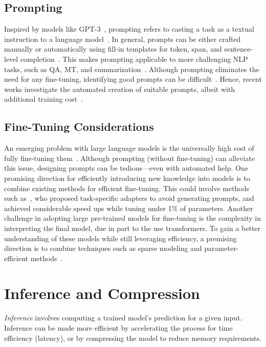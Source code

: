 \subsection{Prompting}\label{sec:prompting}
Inspired by models like GPT-3~\citep{brown2020language}, prompting refers to casting a task as a textual instruction to a language model~\citep{liu2021pre}. In general, prompts can be either crafted manually or automatically using fill-in templates for token, span, and sentence-level completion~\citep{petroni-etal-2019-language,brown2020language,shin-etal-2020-autoprompt}. This makes prompting applicable to more challenging NLP tasks, such as QA, MT, and summarization~\citep{schick-schutze-2021-just}. Although prompting eliminates the need for any fine-tuning, identifying good prompts can be difficult~\cite{liu2021gpt}. Hence, recent works investigate the automated creation of suitable prompts, albeit with additional training cost~\citep{Bach2022-di}.

\subsection{Fine-Tuning Considerations} An emerging problem with large language models is the universally high cost of fully fine-tuning them~\citep{chen2021evaluating}. Although prompting (without fine-tuning) can alleviate this issue, designing prompts can be tedious---even with automated help. One promising direction for efficiently introducing new knowledge into models is to combine existing methods for efficient fine-tuning. This could involve methods such as~\citet{karimi-mahabadi-etal-2022-prompt}, who proposed task-specific adapters to avoid generating prompts, and achieved considerable speed ups while tuning under 1\% of parameters. Another challenge in adopting large pre-trained models for fine-tuning is the complexity in interpreting the final model, due in part to the use transformers. To gain a better understanding of these models while still leveraging efficiency, a premising direction is to combine techniques such as sparse modeling and parameter-efficient methods~\citep{correia_adaptively_2019,treviso-etal-2022-predicting}.

\section{Inference and Compression} \label{sec:inference}

\textit{Inference} involves computing a trained model's prediction for a given input. Inference can be made more efficient by accelerating the process for time efficiency (latency), or by compressing the model to reduce memory requirements. 

